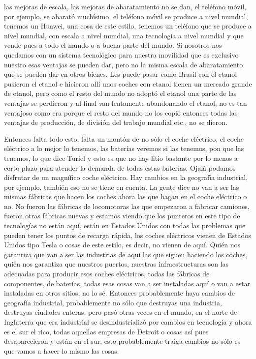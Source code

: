 las mejoras de escala, las mejoras de abaratamiento no se dan, el teléfono móvil, por ejemplo, se abarató muchísimo, el teléfono móvil se produce a nivel mundial, tenemos un Huawei, una cosa de este estilo, tenemos un teléfono que se produce a nivel mundial, con escala a nivel mundial, una tecnología a nivel mundial y que vende pues a todo el mundo o a buena parte del mundo. Si nosotros nos quedamos con un sistema tecnológico para nuestra movilidad que es exclusivo nuestro esas ventajas se pueden dar, pero no la misma escala de abaratamiento que se pueden dar en otros bienes. Les puede pasar como Brasil con el etanol pusieron el etanol e hicieron allí unos coches con etanol tienen un mercado grande de etanol, pero como el resto del mundo no adoptó el etanol una parte de las ventajas se perdieron y al final van lentamente abandonando el etanol, no es tan ventajoso como era porque el resto del mundo no los copió entonces todas las ventajas de producción, de división del trabajo mundial etc., no se dieron.

Entonces falta todo esto, falta un montón de no sólo el coche eléctrico, el coche eléctrico a lo mejor lo tenemos, las baterías veremos si las tenemos, pon que las tenemos, lo que dice Turiel y esto es que no hay litio bastante por lo menos a corto plazo para atender la demanda de todas estas baterías. Ojalá podamos disfrutar de un magnífico coche eléctrico. Hay cambios en la geografía industrial, por ejemplo, también eso no se tiene en cuenta. La gente dice no van a ser las mismas fábricas que hacen los coches ahora las que hagan en el coche eléctrico o no. No fueron las fábricas de locomotoras las que empezaron a fabricar camiones, fueron otras fábricas nuevas y estamos viendo que los punteros en este tipo de tecnologías no están aquí, están en Estados Unidos con todas las problemas que pueden tener los puntos de recarga rápida, los coches eléctricos vienen de Estados Unidos tipo Tesla o cosas de este estilo, es decir, no vienen de aquí. Quién nos garantiza que van a ser las industrias de aquí las que siguen haciendo los coches, quién nos garantiza que nuestros puertos, nuestras infraestructuras son las adecuadas para producir esos coches eléctricos, todas las fábricas de componentes, de baterías, todas esas cosas van a ser instaladas aquí o van a estar instaladas en otros sitios, no lo sé. Entonces probablemente haya cambios de geografía industrial, probablemente no sólo que destruyas una industria, destruyas ciudades enteras, pero pasó otras veces en el mundo, en el norte de Inglaterra que era industrial se desindustrializó por cambios en tecnología y ahora es el sur el rico, todas aquellas empresas de Detroit o cosas así pues desaparecieron y están en el sur, esto probablemente traiga cambios no sólo es que vamos a hacer lo mismo las cosas.

